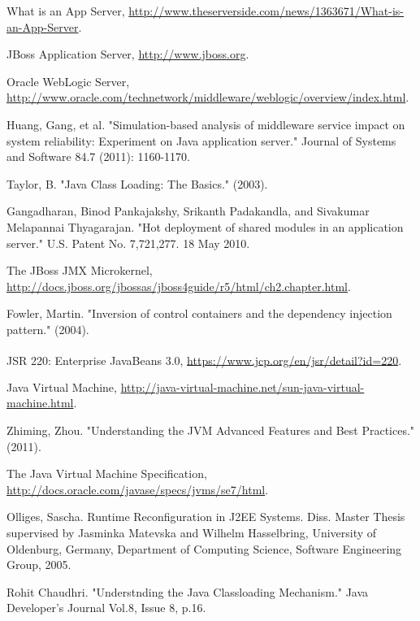 \documentclass[conference]{IEEEtran}
\begin{document}
\begin{thebibliography}{9}

What is an App Server, \url{http://www.theserverside.com/news/1363671/What-is-an-App-Server}.

JBoss Application Server, \url{http://www.jboss.org}.

Oracle WebLogic Server, \url{http://www.oracle.com/technetwork/middleware/weblogic/overview/index.html}.

Huang, Gang, et al. "Simulation-based analysis of middleware service impact on system reliability: Experiment on Java application server." Journal of Systems and Software 84.7 (2011): 1160-1170.

Taylor, B. "Java Class Loading: The Basics." (2003).

Gangadharan, Binod Pankajakshy, Srikanth Padakandla, and Sivakumar Melapannai Thyagarajan. "Hot deployment of shared modules in an application server." U.S. Patent No. 7,721,277. 18 May 2010.

The JBoss JMX Microkernel, \url{http://docs.jboss.org/jbossas/jboss4guide/r5/html/ch2.chapter.html}.

Fowler, Martin. "Inversion of control containers and the dependency injection pattern." (2004).

JSR 220: Enterprise JavaBeans\textsuperscript{\texttrademark} 3.0, \url{https://www.jcp.org/en/jsr/detail?id=220}.


Java Virtual Machine, \url{http://java-virtual-machine.net/sun-java-virtual-machine.html}.

Zhiming, Zhou. "Understanding the JVM Advanced Features and Best Practices." (2011).

The Java Virtual Machine Specification, \url{http://docs.oracle.com/javase/specs/jvms/se7/html}.

Olliges, Sascha. Runtime Reconfiguration in J2EE Systems. Diss. Master Thesis supervised by Jasminka Matevska and Wilhelm Hasselbring, University of Oldenburg, Germany, Department of Computing Science, Software Engineering Group, 2005.

Rohit Chaudhri. "Understnding the Java Classloading Mechanism." Java Developer's Journal Vol.8, Issue 8, p.16.


\end{thebibliography}
\end{document}
